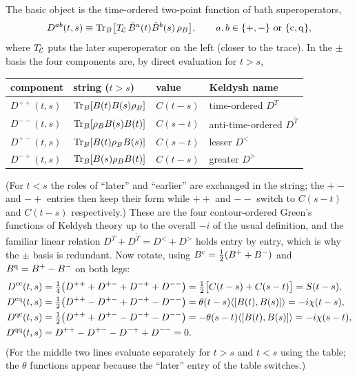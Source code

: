 The basic object is the time-ordered two-point function of bath superoperators,
\begin{equation}
  D^{ab}(t,s)\equiv\Tr_B\!\big[T_{\!\Lc}\,\tilde B^{a}(t)\tilde B^{b}(s)\,\rhoB\big],\qquad a,b\in\{+,-\}\ \text{or}\ \{\cl,\qu\},
\end{equation}
where $T_{\!\mathcal{L}}$ puts the later superoperator on the left (closer to the trace).
In the $\pm$ basis the four components are, by direct evaluation for $t>s$,
\begin{center}
\renewcommand{\arraystretch}{1.3}
\begin{tabular}{@{}llll@{}}
\toprule
component & string ($t>s$) & value & Keldysh name \\
\midrule
$D^{++}(t,s)$ & $\operatorname{Tr}_B[B(t)B(s)\rho_{B}]$ & $C(t-s)$ & time-ordered $D^T$\\
$D^{--}(t,s)$ & $\operatorname{Tr}_B[\rho_{B} B(s)B(t)]$ & $C(s-t)$ & anti-time-ordered $D^{\tilde T}$\\
$D^{+-}(t,s)$ & $\operatorname{Tr}_B[B(t)\rho_{B} B(s)]$ & $C(s-t)$ & lesser $D^{<}$\\
$D^{-+}(t,s)$ & $\operatorname{Tr}_B[B(s)\rho_{B} B(t)]$ & $C(t-s)$ & greater $D^{>}$\\
\bottomrule
\end{tabular}
\end{center}
(For $t<s$ the roles of ``later'' and ``earlier'' are exchanged in the string; the $+-$ and $-+$ entries then keep their form while $++$ and $--$ switch to $C(s-t)$ and $C(t-s)$ respectively.)
These are the four contour-ordered Green's functions of Keldysh theory up to the overall $-i$ of the usual definition, and the familiar linear relation $D^T+D^{\tilde T}=D^<+D^>$ holds entry by entry, which is why the $\pm$ basis is redundant.
Now rotate, using $B^{\mathrm{c}}=\frac12(B^++B^-)$ and $B^{\mathrm{q}}=B^+-B^-$ on both legs:
\begin{align}
  D^{\mathrm{c}\mathrm{c}}(t,s)&=\tfrac14\big(D^{++}+D^{+-}+D^{-+}+D^{--}\big)
   =\tfrac12\big[C(t-s)+C(s-t)\big]=S(t-s),\\
  D^{\mathrm{c}\mathrm{q}}(t,s)&=\tfrac12\big(D^{++}-D^{+-}+D^{-+}-D^{--}\big)
   =\theta(t-s)\langle[B(t),B(s)]\rangle=-i\chi(t-s),\\
  D^{\mathrm{q}\mathrm{c}}(t,s)&=\tfrac12\big(D^{++}+D^{+-}-D^{-+}-D^{--}\big)
   =-\theta(s-t)\langle[B(t),B(s)]\rangle=-i\chi(s-t),\\
  D^{\mathrm{q}\mathrm{q}}(t,s)&=D^{++}-D^{+-}-D^{-+}+D^{--}=0 .
\end{align}
(For the middle two lines evaluate separately for $t>s$ and $t<s$ using the table; the $\theta$ functions appear because the ``later'' entry of the table switches.)
